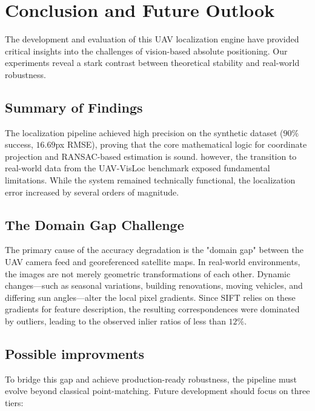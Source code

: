\section{Conclusion and Future Outlook}\label{sec:conclusion}

The development and evaluation of this UAV localization engine have provided critical insights into the challenges of vision-based absolute positioning. Our experiments reveal a stark contrast between theoretical stability and real-world robustness.

\subsection{Summary of Findings}
The localization pipeline achieved high precision on the synthetic dataset ($90\%$ success, $16.69$px RMSE), proving that the core mathematical logic for coordinate projection and RANSAC-based estimation is sound. however, the transition to real-world data from the UAV-VisLoc benchmark exposed fundamental limitations. While the system remained technically functional, the localization error increased by several orders of magnitude.

\subsection{The Domain Gap Challenge}
The primary cause of the accuracy degradation is the "domain gap" between the UAV camera feed and georeferenced satellite maps. In real-world environments, the images are not merely geometric transformations of each other. Dynamic changes---such as seasonal variations, building renovations, moving vehicles, and differing sun angles---alter the local pixel gradients. Since SIFT relies on these gradients for feature description, the resulting correspondences were dominated by outliers, leading to the observed inlier ratios of less than $12\%$.

\subsection{Possible improvments}
To bridge this gap and achieve production-ready robustness, the pipeline must evolve beyond classical point-matching. Future development should focus on three tiers:

